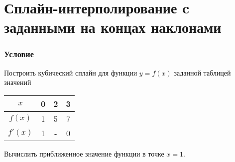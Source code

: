 \documentclass[a4paper, 12pt]{article}
\begin{document}
	\section*{Сплайн-интерполирование c заданными на концах наклонами}
	\subsubsection*{Условие}
	Построить кубический сплайн для функции $y = f(x)$ заданной таблицей значений 
	\begin{center}\begin{tabular}[t]{|c|c|c|c|}
		\hline
		$x$ & 0 & 2 & 3 \\
		\hline
		$f(x)$ & 1 & 5 & 7 \\
		\hline
		$f'(x)$ & 1 & - & 0 \\
		\hline
	\end{tabular}\end{center}
	Вычислить приближенное значение функции в точке $x=1$.
\end{document}
